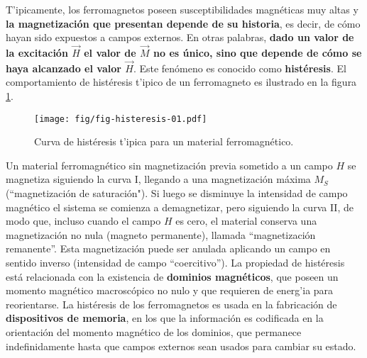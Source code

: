 T'ipicamente, los ferromagnetos poseen susceptibilidades
magnéticas muy altas y \textbf{la magnetización que presentan depende de
su historia}, es decir, de cómo hayan sido expuestos a campos externos. En
otras palabras, \textbf{dado un valor de la excitación $\vec{H}$ el valor de $\vec{M}$
no es único, sino que depende de cómo se haya alcanzado el valor $\vec{H}$}.
Este fenómeno es conocido como \textbf{histéresis}. El comportamiento de
histéresis t'ipico de un ferromagneto es ilustrado en la figura
\ref{fig-histeresis}.
\begin{figure}[!h]
\centerline{\texttt{[image: fig/fig-histeresis-01.pdf]}}
\caption{Curva de histéresis t'ipica para un material ferromagnético.}
\label{fig-histeresis}
\end{figure}
Un material ferromagnético sin magnetización previa sometido a un campo $H$
se magnetiza siguiendo la curva I, llegando a una magnetización máxima $M_S$ (``magnetización de saturación"). 
Si luego se disminuye la intensidad de campo magnético el sistema se comienza
a demagnetizar, pero siguiendo la curva II, de modo que, incluso cuando el
campo $H$ es cero, el material conserva una magnetización no nula (magneto
permanente), llamada ``magnetización remanente''. Esta magnetización puede
ser anulada aplicando un campo en sentido inverso (intensidad de campo
``coercitivo''). La propiedad de histéresis está relacionada con la existencia
de \textbf{dominios magnéticos}, que poseen un momento magnético macroscópico
no nulo y que requieren de energ'ia para reorientarse. La histéresis de los
ferromagnetos es usada en la fabricación de \textbf{dispositivos de memoria}, en los
que la información es codificada en la orientación del momento magnético de
los dominios, que permanece indefinidamente hasta que campos externos sean
usados para cambiar su estado.